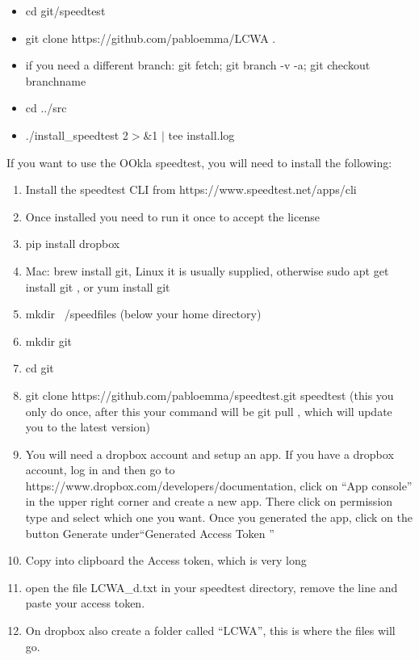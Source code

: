 \documentclass[12pt]{article}
\begin{document}
\begin{itemize}
\item cd git/speedtest
\item git clone https://github.com/pabloemma/LCWA .
\item if you need a different branch: git fetch; git branch -v -a; git checkout branchname
\item cd ../src
\item ./install\_speedtest  2$>$\&1 $|$ tee install.log
\end{itemize}

\vspace{3cm}


If you want to use the OOkla speedtest, you will need to install the following:
\begin{enumerate}
\item	Install the speedtest CLI from  https://www.speedtest.net/apps/cli
\item Once installed you need to run it once to accept the license
\item pip install dropbox
\item Mac: brew install git, Linux it is usually supplied, otherwise sudo apt get install git , or yum install git
\item mkdir ~/speedfiles (below your home directory)
\item mkdir git
\item cd git
\item git clone https://github.com/pabloemma/speedtest.git speedtest (this you only do once, after this your command will be git pull , which will update you to the latest version)
\item You will need a dropbox account and setup an app. If you have a dropbox account, log in and then go to https://www.dropbox.com/developers/documentation, click on ``App console'' in the upper right corner and create a new app. There click on permission type and select which one you want. Once you generated the app, click on the button Generate under``Generated Access Token ''
\item Copy into clipboard the Access token, which is very long
\item open the file LCWA\_d.txt in your speedtest directory, remove the line and paste your access token.
\item On dropbox also create a folder called ``LCWA'', this is where the files will go.
\end{enumerate}
\end{document}
